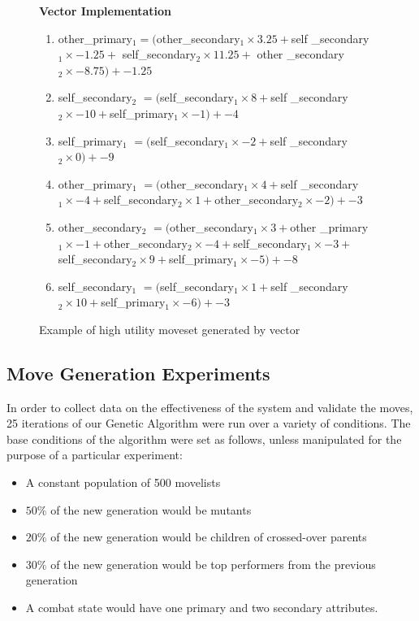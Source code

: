 \documentclass{acm_proc_article-sp}
\begin{document}
 \begin{figure}[!ht]
    \centering
    \textbf {Vector Implementation} \\
    \begin{enumerate}
	\item  other\_primary$_1 = ($other\_secondary$_1 \times 3.25 + $self
\_secondary$_1 \times -1.25 + $ self\_secondary$_2 \times 11.25 + $ other
\_secondary$_2 \times -8.75 ) + -1.25$
	\item  self\_secondary$_2 $ $= ($self\_secondary$_1 \times 8 + $self
\_secondary$_2 \times -10 + $self\_primary$_1 \times -1) + -4$
	\item  self\_primary$_1$ $=($self\_secondary$_1 \times -2 + $self
\_secondary$_2 \times 0) + -9$
	\item  other\_primary$_1$ $=($other\_secondary$_1 \times 4 + $self
\_secondary$_1 \times -4 + $self\_secondary$_2 \times 1 + $other\_secondary$_2 
\times -2) + -3$
	\item  other\_secondary$_2$ $= ($other\_secondary$_1 \times 3 + $other
\_primary$_1 \times -1 + $other\_secondary$_2 \times -4 + $self\_secondary$_1 
\times -3 + $self\_secondary$_2 \times 9 + $self\_primary$_1 \times -5) + -8$
	\item  self\_secondary$_1$ $= ($self\_secondary$_1 \times 1 + $self
\_secondary$_2 \times 10 + $self\_primary$_1 \times -6) + -3$
    \end{enumerate}
    \caption{Example of high utility moveset generated by vector}
    \label{vector_moveset}
    \end{figure}
    
    \subsection{Move Generation Experiments}

In order to collect data on the effectiveness of the system and validate the moves, 25 iterations of our Genetic Algorithm were run over a variety of conditions. The base conditions of the algorithm were set as follows, unless manipulated for the purpose of a particular experiment: 
\begin{itemize}
    \item A constant population of 500 movelists
    \item $50\%$ of the new generation would be mutants
    \item $20\%$ of the new generation would be children of crossed-over parents
    \item $30\%$ of the new generation would be top performers from the previous generation
    \item A combat state would have one primary and two secondary attributes.
\end{itemize}
\end{document}
